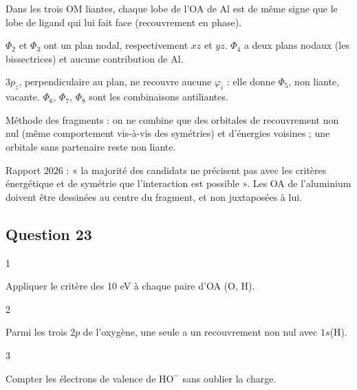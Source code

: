 \documentclass[11pt,a4paper]{article}
\begin{document}
Dans les trois OM liantes, chaque lobe de l'OA de Al est de même signe que le lobe de ligand qui lui fait face (recouvrement en phase).

\(\Phi_2\) et \(\Phi_3\) ont un plan nodal, respectivement \(xz\) et \(yz\). \(\Phi_4\) a deux plans nodaux (les bissectrices) et aucune contribution de Al.

\(3p_z\), perpendiculaire au plan, ne recouvre aucune \(\varphi_i\) : elle donne \(\Phi_5\), non liante, vacante. \(\Phi_6\), \(\Phi_7\), \(\Phi_8\) sont les combinaisons antiliantes.

\begin{methode}

Méthode des fragments : on ne combine que des orbitales de recouvrement non nul (même comportement vis-à-vis des symétries) et d'énergies voisines ; une orbitale sans partenaire reste non liante.

\end{methode}

\begin{jury}

Rapport 2026 : « la majorité des candidats ne précisent pas avec les critères énergétique et de symétrie que l'interaction est possible ». Les OA de l'aluminium doivent être dessinées au centre du fragment, et non juxtaposées à lui.

\end{jury}

\hypertarget{question-23}{%
\subsection{Question 23}\label{question-23}}

\begin{indication}{1}

Appliquer le critère des 10 eV à chaque paire d'OA (O, H).

\end{indication}

\begin{indication}{2}

Parmi les trois \(2p\) de l'oxygène, une seule a un recouvrement non nul avec \(1s\)(H).

\end{indication}

\begin{indication}{3}

Compter les électrons de valence de \(\mathrm{HO^-}\) sans oublier la charge.

\end{indication}
\end{document}
